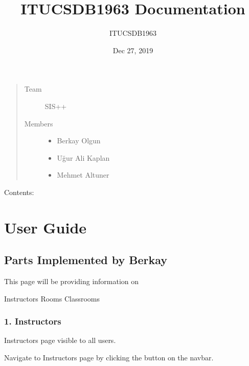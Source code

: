 \documentclass[letterpaper,10pt,english]{sphinxmanual}
\title{ITUCSDB1963 Documentation}
\date{Dec 27, 2019}
\author{ITUCSDB1963}
\begin{document}
\pagestyle{empty}
\sphinxmaketitle
\pagestyle{plain}
\sphinxtableofcontents
\pagestyle{normal}
\label{\detokenize{index::doc}}

\begin{quote}\begin{description}
\item[{Team}] \leavevmode
SIS++

\item[{Members}] \leavevmode\begin{itemize}
\item {} 
Berkay Olgun

\item {} 
Uğur Ali Kaplan

\item {} 
Mehmet Altuner

\end{itemize}

\end{description}\end{quote}


Contents:


\chapter{User Guide}
\label{\detokenize{user/index:user-guide}}\label{\detokenize{user/index::doc}}

\section{Parts Implemented by Berkay}
\label{\detokenize{user/berkay:parts-implemented-by-berkay}}\label{\detokenize{user/berkay::doc}}
This page will be providing information on

Instructors
Rooms
Classrooms


\subsection{1. Instructors}
\label{\detokenize{user/berkay:instructors}}
Instructors page visible to all users.

Navigate to Instructors page by clicking the  button on the navbar.
\end{document}
